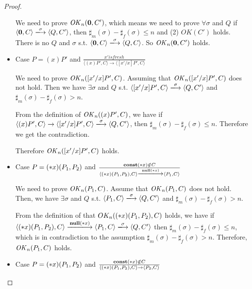 \begin{proof}
\begin{itemize}
  We need to prove \(\mathit{OK}_n({\bf 0}, C')\), which means we need to
  prove \( \forall \sigma \) and \(Q\) if \( \langle {\bf 0}, C
  \rangle \xlongrightarrow{\sigma} \langle Q, C' \rangle \), then
  \(\sharp_{m}(\sigma) - \sharp_{f}(\sigma) \le n\) and (2) \(
  OK(C')\) holds.  There is no \(Q\) and \(\sigma\) s.t. \(\langle
  {\bf 0}, C \rangle \xlongrightarrow{\sigma} \langle Q, C \rangle
  \). So \(\mathit{OK}_n({\bf 0}, C')\) holds.

\item Case \(P = (x)P'\) and \(\frac {x' is fresh }
  {\langle (x)P', C \rangle \rightarrow \langle [x'/x]P', C \rangle} \)

  We need to prove \(\mathit{OK}_n([x'/x]P', C)\). Assuming that
  \(\mathit{OK}_n([x'/x]P', C)\) does not hold. Then we have \(\exists
  \sigma\) and \(Q\) s.t. \( \langle [x'/x]P', C \rangle
  \xlongrightarrow{\sigma} \langle Q, C' \rangle \) and
  \(\sharp_{m}(\sigma) - \sharp_{f}(\sigma) > n\).

  From the definition of \(\mathit{OK}_n((x)P', C)\), we have if \( \langle
  (x)P', C \rangle \rightarrow \langle [x'/x]P', C \rangle
  \xlongrightarrow{\sigma} \langle Q, C' \rangle \), then
  \(\sharp_{m}(\sigma) - \sharp_{f}(\sigma) \le n\). Therefore we get
  the contradiction.

  Therefore \(\mathit{OK}_n([x'/x]P', C)\) holds.
    
\item Case \( P = (*x)(P_1,P_2) \) and \( \frac{ \scon\Sirx \notin C}
  { \langle \Sirx(P_1, P_2), C \rangle \xlongrightarrow{\snull} \langle P_1, C
    \rangle } \)

  We need to prove \(\mathit{OK}_n(P_1, C)\).  Assume that \(\mathit{OK}_n(P_1, C)\)
  does not hold. Then, we have \( \exists \sigma \) and \(Q\)
  s.t. \( \langle P_1, C \rangle \xlongrightarrow{\sigma} \langle Q,
  C' \rangle \) and \(\sharp_{m}(\sigma) -
  \sharp_{f}(\sigma) > n\).

  From the definition of that \(OK_n((*x)(P_1, P_2), C)\) holds, we
  have if \( \langle \Sirx(P_1, P_2), C \rangle
  \xlongrightarrow{\snull} \langle P_1, C \rangle
  \xlongrightarrow{\sigma} \langle Q, C' \rangle \) then
  \(\sharp_m(\sigma) - \sharp_f(\sigma) \le n \), which is in
  contradiction to the assumption \(\sharp_m(\sigma) -
  \sharp_f(\sigma) > n \).  Therefore, \(\mathit{OK}_n(P_1, C)\) holds.

\item Case \( P = (*x)(P_1,P_2) \) and \( \frac{ \mathbf{const}(*x) \notin C}
  { \langle (*x)(P_1, P_2), C \rangle \rightarrow \langle P_2, C
    \rangle } \)


\end{itemize}
\end{proof}
